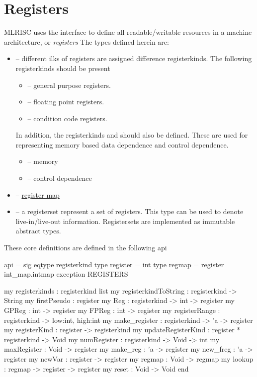 \section{Registers}

MLRISC uses
the  
interface to define all readable/writable resources
in a machine architecture,  or \emph{registers} 
The types defined herein are:
\begin{itemize}
 \item {} -- different ilks of registers are assigned
   difference registerkinds.  The following registerkinds should be present
   \begin{itemize}
     \item {} -- general purpose registers.
     \item {} -- floating point registers.
     \item {} -- condition code registers.
   \end{itemize}
   In addition, the registerkinds  and 
   should also be defined.  These are used for representing
   memory based data dependence and control dependence.
   \begin{itemize}
     \item {} -- memory 
     \item {} -- control dependence
   \end{itemize} 
 \item {} -- \href{regmap.html}{register map}
 \item {} -- a registerset represent a set of registers.  This
   type can be used to denote live-in/live-out information.  Registersets are
   implemented as immutable abstract types.
\end{itemize}

These core definitions are defined in the following api
\begin{SML}
api  =
sig
   eqtype registerkind 
   type register = int
   type regmap = register int_map.intmap
   exception REGISTERS

   my registerkinds : registerkind list 
   my registerkindToString : registerkind -> String
   my firstPseudo : register                    
   my Reg   : registerkind -> int -> register
   my GPReg : int -> register 
   my FPReg : int -> register
   my registerRange : registerkind -> {low:int, high:int}
   my make_register   : registerkind -> 'a -> register 
   my registerKind : register -> registerkind         
   my updateRegisterKind : register * registerkind -> Void        
   my numRegister   : registerkind -> Void -> int              
   my maxRegister   : Void -> register
   my make_reg    : 'a -> register              
   my new_freg   : 'a -> register              
   my newVar    : register -> register
   my regmap    : Void -> regmap
   my lookup    : regmap -> register -> register
   my reset     : Void -> Void
end
\end{SML}

